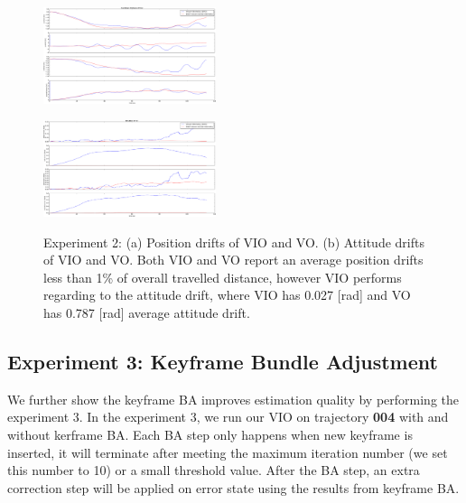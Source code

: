 \begin{figure}
\centering
	\begin{subfloat}[]{
		\includegraphics[width=0.45\textwidth]{CONTENT/Figure/figure5_3_a.png}
		\label{fig:fig5-3-a}}
	\end{subfloat}\qquad
	\begin{subfloat}[]{
		\includegraphics[width=0.45\textwidth]{CONTENT/Figure/figure5_3_b.png}
		\label{fig:fig5-3-b}}
	\end{subfloat}
	
	
	\caption{Experiment 2: (a) Position drifts of VIO and VO. (b) Attitude drifts of VIO and VO. Both VIO and VO report an average position drifts less than 1\% of overall travelled distance, however VIO performs regarding to the attitude drift, where VIO has 0.027 [rad] and VO has 0.787 [rad] average attitude drift.} 
	\label{fig:fig5-3}
\end{figure}

\subsection{Experiment 3: Keyframe Bundle Adjustment}
\label{subsec:experiment3}

We further show the keyframe BA improves estimation quality by performing the experiment 3. In the experiment 3, we run our VIO on trajectory \textbf{004} with and without kerframe BA. Each BA step only happens when new keyframe is inserted, it will terminate after meeting the maximum iteration number (we set this number to 10) or a small threshold value. After the BA step, an extra correction step will be applied on error state using the results from keyframe BA.

